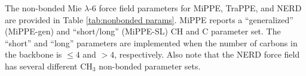 \documentclass[journal=jced,manuscript=article]{achemso}
\begin{document}
    The non-bonded Mie $\lambda$-6 force field parameters for MiPPE, TraPPE, and NERD are provided in Table \ref{tab:nonbonded params}. MiPPE reports a ``generalized'' (MiPPE-gen) and ``short/long'' (MiPPE-SL) CH and C parameter set. The ``short'' and ``long'' parameters are implemented when the number of carbons in the backbone is $\le 4$ and $> 4$, respectively. Also note that the NERD force field has several different CH$_3$ non-bonded parameter sets.
    
\end{document}
